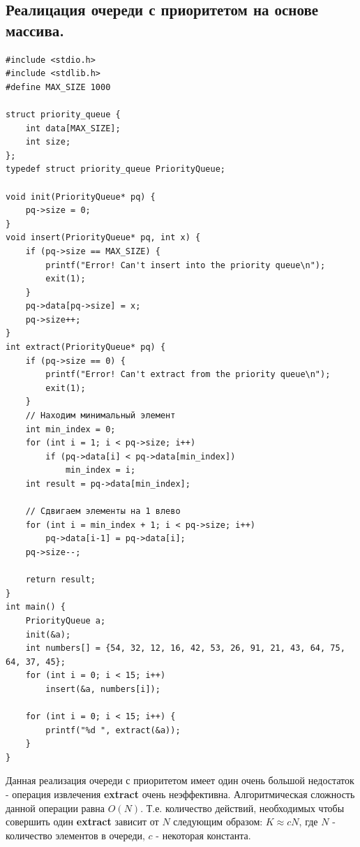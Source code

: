 \documentclass{article}
\begin{document}
\subsection*{Реалицация очереди с приоритетом на основе массива.}
\begin{lstlisting}
#include <stdio.h>
#include <stdlib.h>
#define MAX_SIZE 1000

struct priority_queue {
	int data[MAX_SIZE];
	int size;
};
typedef struct priority_queue PriorityQueue;

void init(PriorityQueue* pq) {
	pq->size = 0;
}
void insert(PriorityQueue* pq, int x) {
	if (pq->size == MAX_SIZE) {
		printf("Error! Can't insert into the priority queue\n");
		exit(1);
	}
	pq->data[pq->size] = x;
	pq->size++;
}
int extract(PriorityQueue* pq) {
	if (pq->size == 0) {
		printf("Error! Can't extract from the priority queue\n");
		exit(1);
	}
	// Находим минимальный элемент
	int min_index = 0;
	for (int i = 1; i < pq->size; i++)
		if (pq->data[i] < pq->data[min_index])
			min_index = i;
	int result = pq->data[min_index];
	
	// Сдвигаем элементы на 1 влево
	for (int i = min_index + 1; i < pq->size; i++)
		pq->data[i-1] = pq->data[i];
	pq->size--;
	
	return result;
}
int main() {
	PriorityQueue a;
	init(&a);
	int numbers[] = {54, 32, 12, 16, 42, 53, 26, 91, 21, 43, 64, 75, 64, 37, 45};
	for (int i = 0; i < 15; i++)
		insert(&a, numbers[i]);
	
	for (int i = 0; i < 15; i++) {
		printf("%d ", extract(&a));
	}
}
\end{lstlisting}
Данная реализация очереди с приоритетом имеет один очень большой недостаток - операция извлечения \textbf{extract} очень неэффективна. Алгоритмическая сложность данной операции равна $O(N)$. Т.е. количество действий, необходимых чтобы совершить один \textbf{extract} зависит от $N$ следующим образом: $K \approx cN$, где $N$ - количество элементов в очереди, $c$ - некоторая константа.
\end{document}

